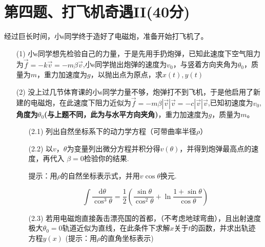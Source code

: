 \documentclass{article}
\begin{document}
\section*{第四题、打飞机奇遇II(40分)}
经过巨长时间，小s同学终于造好了电磁炮，准备开始打飞机了。
\begin{itemize}
\item[(1)]小s同学想先检验自己的力量，于是先用手扔炮弹，已知此速度下空气阻力为$\vec{f}=-k\vec{v}=-m\beta\vec{v}$,小s同学抛出炮弹的速度为$v_0$，与竖着方向夹角为$\theta_0$，质量为$m$，重力加速度为$g$，以抛出点为原点，求$x(t),y(t)$
\item[(2)]没上过几节体育课的小s同学力量不够，炮弹打不到飞机，于是他启用了新建的电磁炮，在此速度下阻力近似为$\vec{f}=-m\beta|\vec{v}|\vec{v}=-c|\vec{v}|\vec{v}$,已知初速度为$v_0$,\textbf{角度为$\theta_0$(与上题不同，此为与水平方向夹角)}，重力加速度为$g$，质量为$m$。
\begin{itemize}
\item[(2.1)]列出自然坐标系下的动力学方程（可带曲率半径$\rho$）
\item[(2.2)]以$v，\theta$为变量列出微分方程并积分得$v(\theta)$，并得到炮弹最高点的速度，再代入 $\beta =0$检验你的结果.\par
提示：用$\rho$的自然坐标表示式，并用$v\cos\theta$换元.\par
    \[
    \int \dfrac{\mathrm{d}\theta}{\cos^3\theta}=\dfrac{1}{2}\left(\dfrac{\sin\theta}{\cos^2\theta}+\ln\dfrac{1+\sin\theta}{\cos\theta}\right)
    \]
\item[(2.3)]若用电磁炮直接轰击漂亮国的首都，（不考虑地球弯曲），且出射速度极大$\theta_0=0$轨道近似为直线，在此条件下求解$x$关于$t$的函数，并求出轨迹方程$y(x)$ (提示：用$\rho$的直角坐标表示)
\end{itemize}
\end{itemize}
\end{document}
